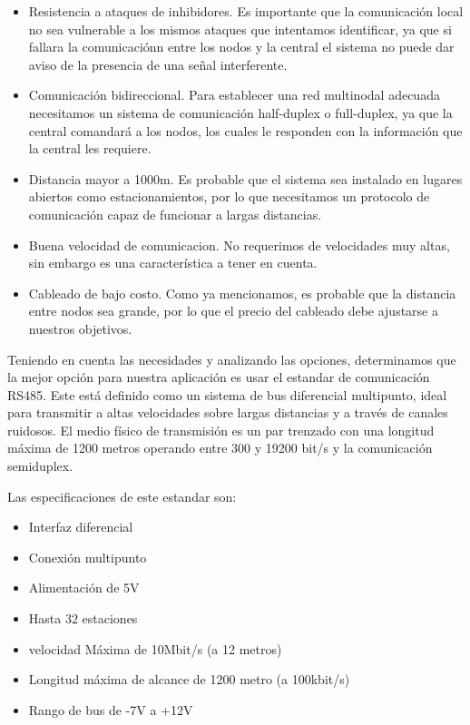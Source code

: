 \begin{itemize}
    \item Resistencia a ataques de inhibidores. Es importante que la comunicación local no sea vulnerable a los mismos ataques que intentamos identificar, ya que
    si fallara la comunicaciónn entre los nodos y la central el sistema no puede dar aviso de la presencia de una señal interferente.
    \item Comunicación bidireccional. Para establecer una red multinodal adecuada necesitamos un sistema de comunicación half-duplex o full-duplex, ya que 
    la central comandará a los nodos, los cuales le responden con la información que la central les requiere.
    \item Distancia mayor a 1000m. Es probable que el sistema sea instalado en lugares abiertos como estacionamientos, por lo que necesitamos un protocolo de 
    comunicación capaz de funcionar a largas distancias.
    \item Buena velocidad de comunicacion. No requerimos de velocidades muy altas, sin embargo es una característica a tener en cuenta.
    \item Cableado de bajo costo. Como ya mencionamos, es probable que la distancia entre nodos sea grande, por lo que el precio del cableado debe ajustarse 
    a nuestros objetivos.

\end{itemize}

Teniendo en cuenta las necesidades y analizando las opciones, determinamos que la mejor opción para nuestra aplicación es usar el estandar de comunicación RS485. 
Este está definido como un sistema de bus diferencial multipunto, ideal para transmitir a altas velocidades sobre largas distancias y a través de canales ruidosos.
El medio físico de transmisión es un par trenzado con una longitud máxima de 1200 metros operando entre 300 y 19200 bit/s y la comunicación semiduplex.\par
Las especificaciones de este estandar son:

\begin{itemize}
    \item Interfaz diferencial
    \item Conexión multipunto
    \item Alimentación de 5V
    \item Hasta 32 estaciones 
    \item velocidad Máxima de 10Mbit/s (a 12 metros)
    \item Longitud máxima de alcance de 1200 metro (a 100kbit/s)
    \item Rango de bus de -7V a +12V

\end{itemize}

